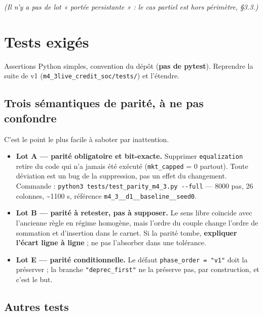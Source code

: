 \documentclass[11pt,a4paper]{article}
\newcommand{\code}[1]{\texttt{#1}}
\begin{document}
\emph{(Il n'y a pas de lot « portée persistante » : le cas partiel est hors périmètre, §3.3.)}

\bigskip

\setcounter{section}{8}
\section{Tests exigés}

Assertions Python simples, convention du dépôt (\textbf{pas de pytest}). Reprendre la suite de v1 (\code{m4\_3live\_credit\_soc/tests/}) et l'étendre.

\subsection*{Trois sémantiques de parité, à ne pas confondre}

C'est le point le plus facile à saboter par inattention.

\begin{itemize}
\item \textbf{Lot A --- parité obligatoire et bit-exacte.} Supprimer \code{equalization} retire du code qui n'a jamais été exécuté (\code{mkt\_capped} = 0 partout). Toute déviation est un bug de la suppression, pas un effet du changement. Commande : \code{python3 tests/test\_parity\_m4\_3.py -{}-full} --- 8000 pas, 26 colonnes, \textasciitilde{}1100 s, référence \code{m4\_3\_\_d1\_\_baseline\_\_seed0}.
\item \textbf{Lot B --- parité à retester, pas à supposer.} Le sens libre coïncide avec l'ancienne règle en régime homogène, mais l'ordre du couple change l'ordre de sommation et d'insertion dans le carnet. Si la parité tombe, \textbf{expliquer l'écart ligne à ligne} ; ne pas l'absorber dans une tolérance.
\item \textbf{Lot E --- parité conditionnelle.} Le défaut \code{phase\_order = "v1"} doit la préserver ; la branche \code{"deprec\_first"} ne la préserve pas, par construction, et c'est le but.
\end{itemize}

\subsection*{Autres tests}
\end{document}
